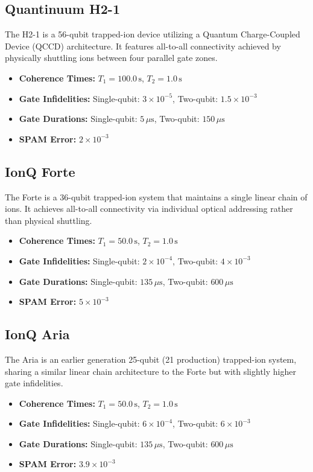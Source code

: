 \documentclass[10pt,twocolumn]{article}
\begin{document}
\subsection{Quantinuum H2-1 \cite{quantinuum_h2_emergentmind, quantinuum_h2_docs}}
\label{subsec:profile_h2}
    The H2-1 is a 56-qubit trapped-ion device utilizing a Quantum Charge-Coupled Device (QCCD) architecture. It features all-to-all connectivity achieved by physically shuttling ions between four parallel gate zones.
    \begin{itemize}
        \item \textbf{Coherence Times:} $T_1 = 100.0\,\text{s}$, $T_2 = 1.0\,\text{s}$
        \item \textbf{Gate Infidelities:} Single-qubit: $3 \times 10^{-5}$, Two-qubit: $1.5 \times 10^{-3}$
        \item \textbf{Gate Durations:} Single-qubit: $5\,\mu\text{s}$, Two-qubit: $150\,\mu\text{s}$
        \item \textbf{SPAM Error:} $2 \times 10^{-3}$
    \end{itemize}

\subsection{IonQ Forte \cite{ionq_forte, ionq_forte_first}}
\label{subsec:profile_forte}
    The Forte is a 36-qubit trapped-ion system that maintains a single linear chain of ions. It achieves all-to-all connectivity via individual optical addressing rather than physical shuttling.
    \begin{itemize}
        \item \textbf{Coherence Times:} $T_1 = 50.0\,\text{s}$, $T_2 = 1.0\,\text{s}$
        \item \textbf{Gate Infidelities:} Single-qubit: $2 \times 10^{-4}$, Two-qubit: $4 \times 10^{-3}$
        \item \textbf{Gate Durations:} Single-qubit: $135\,\mu\text{s}$, Two-qubit: $600\,\mu\text{s}$
        \item \textbf{SPAM Error:} $5 \times 10^{-3}$
    \end{itemize}

\subsection{IonQ Aria \cite{ionq_aria}}
\label{subsec:profile_aria}
    The Aria is an earlier generation 25-qubit (21 production) trapped-ion system, sharing a similar linear chain architecture to the Forte but with slightly higher gate infidelities.
    \begin{itemize}
        \item \textbf{Coherence Times:} $T_1 = 50.0\,\text{s}$, $T_2 = 1.0\,\text{s}$
        \item \textbf{Gate Infidelities:} Single-qubit: $6 \times 10^{-4}$, Two-qubit: $6 \times 10^{-3}$
        \item \textbf{Gate Durations:} Single-qubit: $135\,\mu\text{s}$, Two-qubit: $600\,\mu\text{s}$
        \item \textbf{SPAM Error:} $3.9 \times 10^{-3}$
    \end{itemize}
\end{document}
